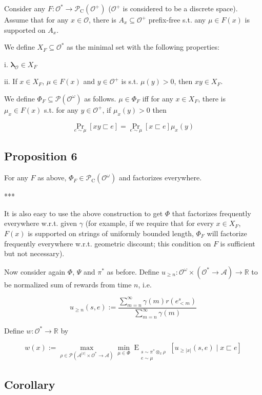 \documentclass[a4paper]{article}
\DeclareMathOperator{\Prb}{Pr}
\newcommand{\EE}[2]{\operatorname{E}_{\substack{#1 \\ #2}}}
\newcommand{\Reals}{\mathbb{R}}
\newcommand{\Estr}{\bm{\lambda}}
\newcommand{\Abs}[1]{\lvert #1 \rvert}
\newcommand{\Prob}{\mathcal{P}}
\newcommand{\Act}{\mathcal{A}}
\newcommand{\Obs}{\mathcal{O}}
\newcommand{\ObsO}{\Obs^\omega}
\newcommand{\Pol}{\Obs^* \rightarrow \Act}
\newcommand{\CC}{\mathcal{P}_{\operatorname{C}}}
\begin{document}
Consider any ${F: \Obs^* \rightarrow \CC(\Obs^+)}$ (${\Obs^+}$ is considered to be a discrete space). Assume that for any ${x \in \Obs}$, there is ${A_x \subseteq \Obs^+}$ prefix-free s.t. any ${\mu \in F(x)}$ is supported on ${A_x}$.

We define ${X_F \subseteq \Obs^*}$ as the minimal set with the following properties:

i. ${\Estr_\Obs \in X_F}$

ii. If ${x \in X_F}$, ${\mu \in F(x)}$ and ${y \in \Obs^+}$ is s.t. ${\mu(y) > 0}$, then ${xy \in X_F}$.

We define ${\Phi_F \subseteq \Prob(\ObsO)}$ as follows. ${\mu \in \Phi_F}$ iff for any ${x \in X_F}$, there is ${\mu_x \in F(x)}$ s.t. for any ${y \in \Obs^+}$, if ${\mu_x(y) > 0}$ then

$$\Prb_{e \sim \mu}[xy \sqsubset e] = \Prb_{e \sim \mu}[x \sqsubset e] \mu_x(y)$$

\subsection{Proposition 6}

For any ${F}$ as above, ${\Phi_F \in \CC(\ObsO)}$ and factorizes everywhere.

***

It is also easy to use the above construction to get ${\Phi}$ that factorizes frequently everywhere w.r.t. given ${\gamma}$ (for example, if we require that for every ${x \in X_F}$, ${F(x)}$ is supported on strings of uniformly bounded length, ${\Phi_F}$ will factorize frequently everywhere w.r.t. geometric discount; this condition on ${F}$ is sufficient but not necessary).

Now consider again ${\Phi}$, ${\Psi}$ and ${\pi^*}$ as before. Define ${u_{\geq n}: \ObsO \times (\Pol) \rightarrow \Reals}$ to be normalized sum of rewards from time ${n}$, i.e.

$$u_{\geq n}(s,e):=\frac{\sum_{m=n}^\infty \gamma(m)r(e^s_{<m})}{\sum_{m=n}^\infty \gamma(m)}$$

Define ${w: \Obs^* \rightarrow \Reals}$ by

$$w(x):=\max_{\rho \in \Prob(\Act^{\Abs{x}} \times \Obs^* \rightarrow \Act)} \min_{\mu \in \Phi} \EE{s \sim \pi^* \otimes_x \rho}{e \sim \mu}[u_{\geq \Abs{x}}(s,e) \mid x \sqsubset e]$$

\subsection{Corollary}
\end{document}
